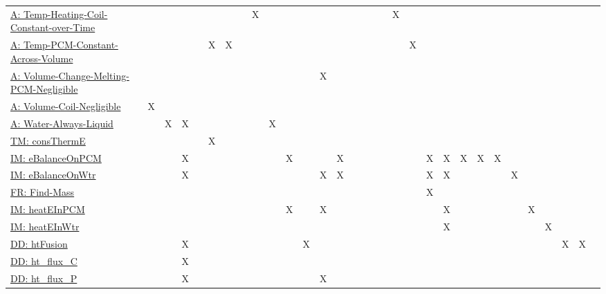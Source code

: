 \documentclass[12pt]{article}
\begin{document}
\begin{longtable}{l l l l l l l l l l l l l l l l l l l l l l l l l l l l l l l}
\hyperref[A:Temp-Heating-Coil-Constant-over-Time]{A: Temp-Heating-Coil-Constant-over-Time} &  &  &  &  &  &  &  & X &  &  &  &  &  &  &  &  &  & X &  &  &  &  &  &  &  &  &  &  &  & 
\\
\hyperref[A:Temp-PCM-Constant-Across-Volume]{A: Temp-PCM-Constant-Across-Volume} &  &  &  &  & X & X &  &  &  &  &  &  &  &  &  &  &  &  & X &  &  &  &  &  &  &  &  &  &  & 
\\
\hyperref[A:Volume-Change-Melting-PCM-Negligible]{A: Volume-Change-Melting-PCM-Negligible} &  &  &  &  &  &  &  &  &  &  &  & X &  &  &  &  &  &  &  &  &  &  &  &  &  &  &  &  &  & 
\\
\hyperref[A:Volume-Coil-Negligible]{A: Volume-Coil-Negligible} & X &  &  &  &  &  &  &  &  &  &  &  &  &  &  &  &  &  &  &  &  &  &  &  &  &  &  &  &  & 
\\
\hyperref[A:Water-Always-Liquid]{A: Water-Always-Liquid} &  & X & X &  &  &  &  &  & X &  &  &  &  &  &  &  &  &  &  &  &  &  &  &  &  &  &  &  &  & 
\\
\hyperref[TM:consThermE]{TM: consThermE} &  &  &  &  & X &  &  &  &  &  &  &  &  &  &  &  &  &  &  &  &  &  &  &  &  &  &  &  &  & 
\\
\hyperref[IM:eBalanceOnPCM]{IM: eBalanceOnPCM} &  &  & X &  &  &  &  &  &  & X &  &  & X &  &  &  &  &  &  & X & X & X & X & X &  &  &  &  &  & 
\\
\hyperref[IM:eBalanceOnWtr]{IM: eBalanceOnWtr} &  &  & X &  &  &  &  &  &  &  &  & X & X &  &  &  &  &  &  & X & X &  &  &  & X &  &  &  &  & 
\\
\hyperref[findMass]{FR: Find-Mass} &  &  &  &  &  &  &  &  &  &  &  &  &  &  &  &  &  &  &  & X &  &  &  &  &  &  &  &  &  & 
\\
\hyperref[IM:heatEInPCM]{IM: heatEInPCM} &  &  &  &  &  &  &  &  &  & X &  & X &  &  &  &  &  &  &  &  & X &  &  &  &  & X &  &  &  & 
\\
\hyperref[IM:heatEInWtr]{IM: heatEInWtr} &  &  &  &  &  &  &  &  &  &  &  &  &  &  &  &  &  &  &  &  & X &  &  &  &  &  & X &  &  & 
\\
\hyperref[DD:htFusion]{DD: htFusion} &  &  & X &  &  &  &  &  &  &  & X &  &  &  &  &  &  &  &  &  &  &  &  &  &  &  &  & X & X & 
\\
\hyperref[DD:ht.flux.C]{DD: ht\_flux\_C} &  &  & X &  &  &  &  &  &  &  &  &  &  &  &  &  &  &  &  &  &  &  &  &  &  &  &  &  &  & 
\\
\hyperref[DD:ht.flux.P]{DD: ht\_flux\_P} &  &  & X &  &  &  &  &  &  &  &  & X &  &  &  &  &  &  &  &  &  &  &  &  &  &  &  &  &  & 

\end{longtable}
\end{document}
